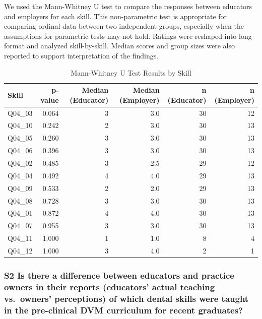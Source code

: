 \documentclass[
  11pt,
  letterpaper,
  DIV=11,
  numbers=noendperiod]{scrartcl}
\numberwithin{figure}{section}
\begin{document}
We used the Mann-Whitney U test to compare the responses between
educators and employers for each skill. This non-parametric test is
appropriate for comparing ordinal data between two independent groups,
especially when the assumptions for parametric tests may not hold.
Ratings were reshaped into long format and analyzed skill-by-skill.
Median scores and group sizes were also reported to support
interpretation of the findings.

\begin{table}
\caption*{
{\large Mann-Whitney U Test Results by Skill}
} 
\fontsize{12.0pt}{14.4pt}\selectfont
\begin{tabular*}{\linewidth}{@{\extracolsep{\fill}}lrrrrr}
\toprule
Skill & p-value & Median (Educator) & Median (Employer) & n (Educator) & n (Employer) \\ 
\midrule\addlinespace[2.5pt]
Q04\_03 & 0.064 & 3 & 3.0 & 30 & 12 \\ 
Q04\_10 & 0.242 & 2 & 3.0 & 30 & 13 \\ 
Q04\_05 & 0.260 & 3 & 3.0 & 30 & 13 \\ 
Q04\_06 & 0.396 & 3 & 3.0 & 30 & 13 \\ 
Q04\_02 & 0.485 & 3 & 2.5 & 29 & 12 \\ 
Q04\_04 & 0.492 & 4 & 4.0 & 29 & 13 \\ 
Q04\_09 & 0.533 & 2 & 2.0 & 29 & 13 \\ 
Q04\_08 & 0.728 & 3 & 3.0 & 30 & 13 \\ 
Q04\_01 & 0.872 & 4 & 4.0 & 30 & 13 \\ 
Q04\_07 & 0.955 & 3 & 3.0 & 30 & 13 \\ 
Q04\_11 & 1.000 & 1 & 1.0 & 8 & 4 \\ 
Q04\_12 & 1.000 & 3 & 4.0 & 2 & 1 \\ 
\bottomrule
\end{tabular*}
\end{table}

\subsubsection{S2 Is there a difference between educators and practice
owners in their reports (educators' actual teaching vs.~owners'
perceptions) of which dental skills were taught in the pre-clinical DVM
curriculum for recent
graduates?}\label{s2-is-there-a-difference-between-educators-and-practice-owners-in-their-reports-educators-actual-teaching-vs.-owners-perceptions-of-which-dental-skills-were-taught-in-the-pre-clinical-dvm-curriculum-for-recent-graduates}
\end{document}
